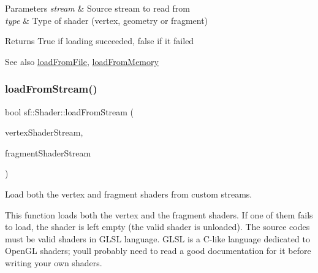 \begin{DoxyParams}{Parameters}
{\em stream} & Source stream to read from \\
\hline
{\em type} & Type of shader (vertex, geometry or fragment)\\
\hline
\end{DoxyParams}
\begin{DoxyReturn}{Returns}
True if loading succeeded, false if it failed
\end{DoxyReturn}
\begin{DoxySeeAlso}{See also}
\hyperlink{classsf_1_1_shader_a053a5632848ebaca2fcd8ba29abe9e6e}{load\+From\+File}, \hyperlink{classsf_1_1_shader_ac92d46bf71dff2d791117e4e472148aa}{load\+From\+Memory} 
\end{DoxySeeAlso}
\mbox{\label{classsf_1_1_shader_a3b7958159ffb5596c4babc3052e35465}} 
\subsubsection{\texorpdfstring{load\+From\+Stream()}{loadFromStream()}\hspace{0.1cm}{\footnotesize\ttfamily [2/3]}}
{\footnotesize\ttfamily bool sf\+::\+Shader\+::load\+From\+Stream (\begin{DoxyParamCaption}\item[{\hyperlink{classsf_1_1_input_stream}{Input\+Stream} \&}]{vertex\+Shader\+Stream,  }\item[{\hyperlink{classsf_1_1_input_stream}{Input\+Stream} \&}]{fragment\+Shader\+Stream }\end{DoxyParamCaption})}



Load both the vertex and fragment shaders from custom streams. 

This function loads both the vertex and the fragment shaders. If one of them fails to load, the shader is left empty (the valid shader is unloaded). The source codes must be valid shaders in G\+L\+SL language. G\+L\+SL is a C-\/like language dedicated to Open\+GL shaders; you\textquotesingle{}ll probably need to read a good documentation for it before writing your own shaders.


